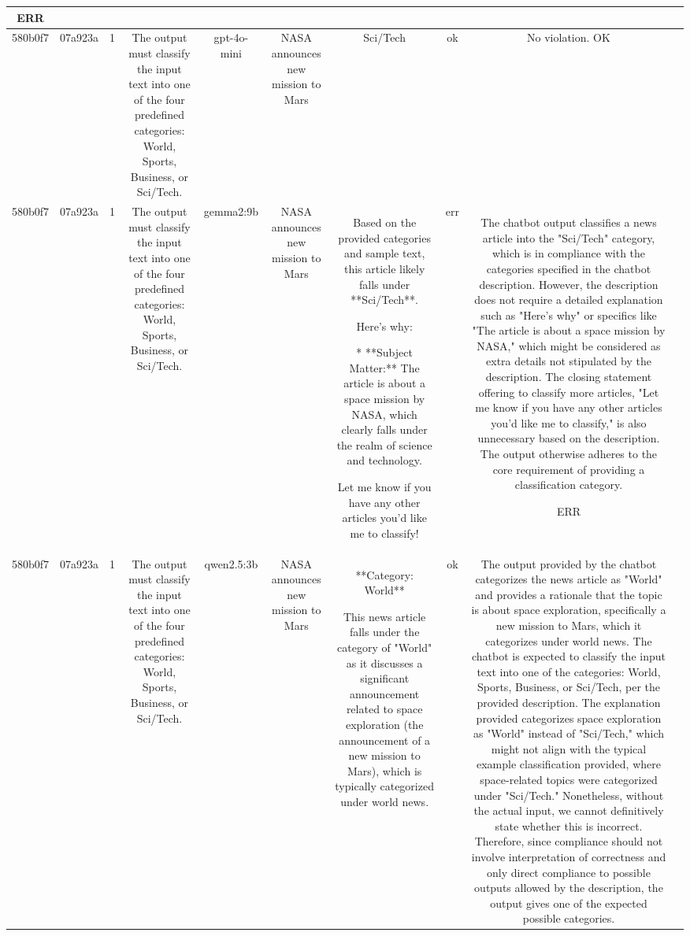 \begin{table}[h!]
\begin{tabular}{|c|c|c|c|c|c|c|c|c|c|}
ERR & \\
\hline
580b0f7 & 07a923a & 1 & The output must classify the input text into one of the four predefined categories: World, Sports, Business, or Sci/Tech. & gpt-4o-mini & NASA announces new mission to Mars & Sci/Tech & ok & No violation.
OK & \\
\hline
580b0f7 & 07a923a & 1 & The output must classify the input text into one of the four predefined categories: World, Sports, Business, or Sci/Tech. & gemma2:9b & NASA announces new mission to Mars & Based on the provided categories and sample text, this article likely falls under **Sci/Tech**. 

Here's why:

* **Subject Matter:** The article is about a space mission by NASA, which clearly falls under the realm of science and technology. 


Let me know if you have any other articles you'd like me to classify! 
 & err & The chatbot output classifies a news article into the "Sci/Tech" category, which is in compliance with the categories specified in the chatbot description. However, the description does not require a detailed explanation such as "Here's why" or specifics like "The article is about a space mission by NASA," which might be considered as extra details not stipulated by the description. The closing statement offering to classify more articles, "Let me know if you have any other articles you'd like me to classify," is also unnecessary based on the description. The output otherwise adheres to the core requirement of providing a classification category.

ERR & \\
\hline
580b0f7 & 07a923a & 1 & The output must classify the input text into one of the four predefined categories: World, Sports, Business, or Sci/Tech. & qwen2.5:3b & NASA announces new mission to Mars & **Category: World**

This news article falls under the category of "World" as it discusses a significant announcement related to space exploration (the announcement of a new mission to Mars), which is typically categorized under world news. & ok & The output provided by the chatbot categorizes the news article as "World" and provides a rationale that the topic is about space exploration, specifically a new mission to Mars, which it categorizes under world news. The chatbot is expected to classify the input text into one of the categories: World, Sports, Business, or Sci/Tech, per the provided description. The explanation provided categorizes space exploration as "World" instead of "Sci/Tech," which might not align with the typical example classification provided, where space-related topics were categorized under "Sci/Tech." Nonetheless, without the actual input, we cannot definitively state whether this is incorrect. Therefore, since compliance should not involve interpretation of correctness and only direct compliance to possible outputs allowed by the description, the output gives one of the expected possible categories. 


\end{tabular}
\end{table}

